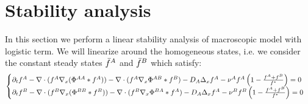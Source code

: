 \section{Stability analysis}

In this section we perform a linear stability analysis of macroscopic model with logistic term.
We will linearize around the homogeneous states, i.e. we consider the constant steady states ${\bar{f}^A}$ and ${\bar{f}^B}$ which satisfy:
	\begin{equation}
\begin{cases}
{\partial}_t f^{A}-  \nabla \cdot (f^A\nabla_x(\Phi^{AA}* f^A)) - \nabla \cdot (f^A \nabla_x \Phi^{AB}*f^B) - D_A \Delta_x f^A - \nu^{A}f^A\left( 1-\frac{f^A+f^B}{f^{*}} \right)=0 \\

{\partial}_t f^{B}-  \nabla \cdot (f^B\nabla_x(\Phi^{BB}* f^B)) - \nabla \cdot (f^B \nabla_x \Phi^{BA}*f^A) - D_A \Delta_x f^A - \nu^{B}f^B\left( 1-\frac{f^A+f^B}{f^{*}} \right)=0
\end{cases}
\end{equation}

